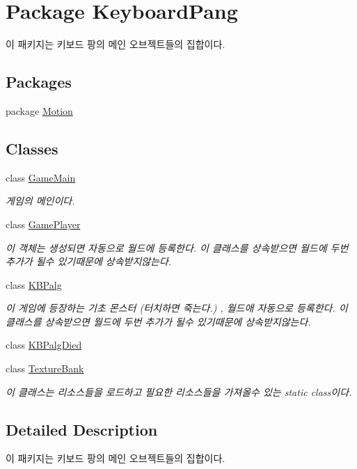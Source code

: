 \hypertarget{namespace_keyboard_pang}{\section{Package Keyboard\-Pang}
\label{namespace_keyboard_pang}
}


이 패키지는 키보드 팡의 메인 오브젝트들의 집합이다.  


\subsection*{Packages}
\begin{DoxyCompactItemize}
\item 
package \hyperlink{namespace_keyboard_pang_1_1_motion}{Motion}
\end{DoxyCompactItemize}
\subsection*{Classes}
\begin{DoxyCompactItemize}
\item 
class \hyperlink{class_keyboard_pang_1_1_game_main}{Game\-Main}
\begin{DoxyCompactList}\small\item\em 게임의 메인이다. \end{DoxyCompactList}\item 
class \hyperlink{class_keyboard_pang_1_1_game_player}{Game\-Player}
\begin{DoxyCompactList}\small\item\em 이 객체는 생성되면 자동으로 월드에 등록한다. 이 클래스를 상속받으면 월드에 두번 추가가 될수 있기때문에 상속받지않는다. \end{DoxyCompactList}\item 
class \hyperlink{class_keyboard_pang_1_1_k_b_palg}{K\-B\-Palg}
\begin{DoxyCompactList}\small\item\em 이 게임에 등장하는 기초 몬스터 (터치하면 죽는다.) , 월드애 자동으로 등록한다. 이 클래스를 상속받으면 월드에 두번 추가가 될수 있기때문에 상속받지않는다. \end{DoxyCompactList}\item 
class \hyperlink{class_keyboard_pang_1_1_k_b_palg_died}{K\-B\-Palg\-Died}
\item 
class \hyperlink{class_keyboard_pang_1_1_texture_bank}{Texture\-Bank}
\begin{DoxyCompactList}\small\item\em 이 클래스는 리소스들을 로드하고 필요한 리소스들을 가져올수 있는 static class이다. \end{DoxyCompactList}\end{DoxyCompactItemize}


\subsection{Detailed Description}
이 패키지는 키보드 팡의 메인 오브젝트들의 집합이다. 
